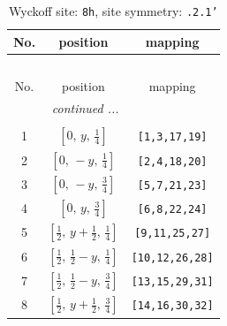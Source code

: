 \documentclass[fleqn,8pt]{jsarticle}
\begin{document}
\begin{longtable}{ccc}
\caption{Wyckoff site: {\tt 8h}, site symmetry: {\tt .2.1'}}
 \\
 \hline \hline
No. & position & mapping \\ \hline \endfirsthead

\multicolumn{2}{l}{\tablename\ \thetable{}} \\
 \hline \hline
No. & position & mapping \\ \hline \endhead

 \hline \hline
\multicolumn{2}{r}{\footnotesize\it continued ...} \\ \endfoot

 \hline \hline
\multicolumn{2}{r}{} \\ \endlastfoot

1 & $\left[ 0,\, y,\, \frac{1}{4} \right]$ & {\tt [1,3,17,19]} \\ \hline
2 & $\left[ 0,\, - y,\, \frac{1}{4} \right]$ & {\tt [2,4,18,20]} \\ \hline
3 & $\left[ 0,\, - y,\, \frac{3}{4} \right]$ & {\tt [5,7,21,23]} \\ \hline
4 & $\left[ 0,\, y,\, \frac{3}{4} \right]$ & {\tt [6,8,22,24]} \\ \hline
5 & $\left[ \frac{1}{2},\, y + \frac{1}{2},\, \frac{1}{4} \right]$ & {\tt [9,11,25,27]} \\ \hline
6 & $\left[ \frac{1}{2},\, \frac{1}{2} - y,\, \frac{1}{4} \right]$ & {\tt [10,12,26,28]} \\ \hline
7 & $\left[ \frac{1}{2},\, \frac{1}{2} - y,\, \frac{3}{4} \right]$ & {\tt [13,15,29,31]} \\ \hline
8 & $\left[ \frac{1}{2},\, y + \frac{1}{2},\, \frac{3}{4} \right]$ & {\tt [14,16,30,32]} \\
\end{longtable}
\renewcommand{\arraystretch}{1.2}
\end{document}
